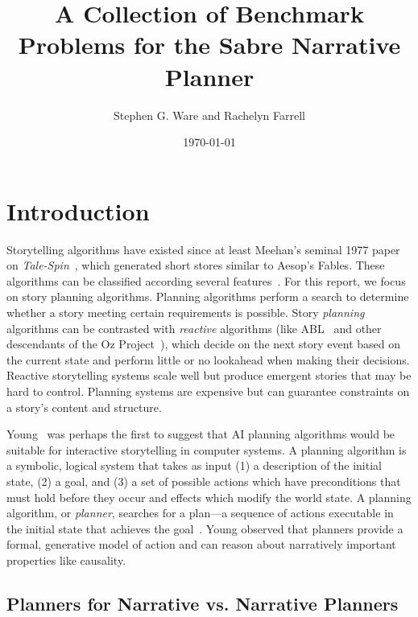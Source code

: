 \documentclass{nilreport}
\title{A Collection of Benchmark Problems for the Sabre Narrative Planner}
\author{Stephen G. Ware and Rachelyn Farrell}
\date{\today}
\begin{document}
\maketitle

\tableofcontents

\newpage


\section{Introduction}

Storytelling algorithms have existed since at least Meehan's seminal
1977 paper on \emph{Tale-Spin}~\cite{meehan1977tale}, which generated
short stores similar to Aesop's Fables. These algorithms can be classified
according several features~\cite{kybartas2016survey}. For this report,
we focus on story planning algorithms. Planning algorithms perform
a search to determine whether a story meeting certain requirements
is possible. Story \emph{planning} algorithms can be contrasted with
\emph{reactive} algorithms (like ABL~\cite{mateas2004behavior} and
other descendants of the Oz Project~\cite{mateas2001oz}), which
decide on the next story event based on the current state and perform
little or no lookahead when making their decisions. Reactive storytelling
systems scale well but produce emergent stories that may be hard to
control. Planning systems are expensive but can guarantee constraints
on a story's content and structure.

Young~\cite{young1999notes} was perhaps the first to suggest that
AI planning algorithms would be suitable for interactive storytelling
in computer systems. A planning algorithm is a symbolic, logical system
that takes as input (1) a description of the initial state, (2) a
goal, and (3) a set of possible actions which have preconditions that
must hold before they occur and effects which modify the world state.
A planning algorithm, or \emph{planner}, searches for a plan---a
sequence of actions executable in the initial state that achieves
the goal~\cite{weld1999recent}. Young observed that planners provide
a formal, generative model of action and can reason about narratively
important properties like causality.

\subsection{Planners for Narrative vs. Narrative Planners}
\end{document}
